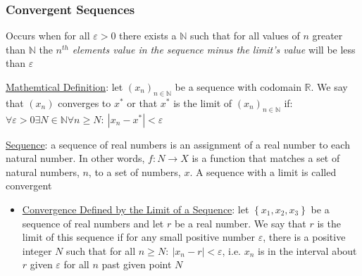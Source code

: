 \documentclass{article}
\begin{document}
\subsubsection{Convergent Sequences}
Occurs when for all $\varepsilon > 0$ there exists a $\mathbb{N}$ such that for all values of $n$ greater than $\mathbb{N}$ the $n^{th}$ \textit{elements value in the sequence minus the limit's value} will be less than $\varepsilon$ \par \vspace{0.3em}
  \underline{Mathemtical Definition}: let $(x_{n})_{n \in \mathbb{N}}$ be a sequence with codomain $\mathbb{R}$. We say that $(x_{n})$ converges to $x^{*}$ or that $x^{*}$ is the limit of $(x_{n})_{n \in \mathbb{N}}$ if: $\forall \varepsilon > 0 \exists N \in \mathbb{N} \forall n \geq N: \ |x_{n} - x^{*}| < \varepsilon$ \par
  \underline{Sequence}: a sequence of real numbers is an assignment of a real number to each natural number. In other words, $f: N \rightarrow X$ is a function that matches a set of natural numbers, $n$, to a set of numbers, $x$. A sequence with a limit is called convergent
  \begin{itemize}
    \item  \underline{Convergence Defined by the Limit of a Sequence}: let $\left\{ x_{1}, x_{2}, x_{3} \right\}$  be a sequence of real numbers and let $r$ be a real number. We say that $r$ is the limit of this sequence if for any small positive number $\varepsilon$, there is a positive integer $N$ such that for all $n \geq N: \ |x_{n} - r| < \varepsilon$, i.e. $x_{n}$ is in the interval about $r$ given $\varepsilon$ for all $n$ past given point $N$
  \end{itemize}
  \par
\vspace{6mm}
\end{document}
